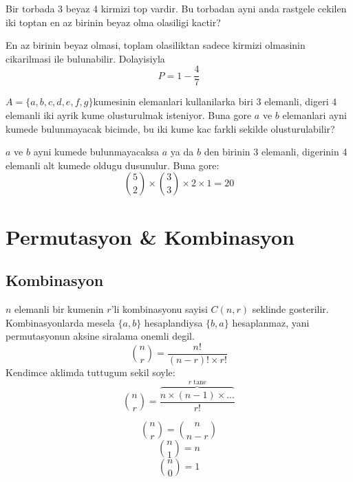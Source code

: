 \documentclass{ximera}
\begin{document}
\begin{example}
Bir torbada 3 beyaz 4 kirmizi top vardir. Bu torbadan ayni anda rastgele cekilen iki toptan en az birinin beyaz olma olasiligi kactir?
\end{example}
\begin{explanation}
En az birinin beyaz olmasi, toplam olasiliktan sadece kirmizi olmasinin cikarilmasi ile bulunabilir. Dolayisiyla
\[
P = 1 - \frac{4}{7}
\]
\end{explanation}

\begin{example}
$ A = \{a, b, c, d, e, f, g\}$kumesinin elemanlari kullanilarka biri 3 elemanli, digeri 4 elemanli iki ayrik kume olusturulmak isteniyor. Buna gore $a$ ve $b$ elemanlari ayni kumede bulunmayacak bicimde, bu iki kume kac farkli sekilde olusturulabilir?
\end{example}
\begin{explanation}
$a$ ve $b$ ayni kumede bulunmayacaksa $a$ ya da $b$ den birinin 3 elemanli, digerinin 4 elemanli alt kumede oldugu dusunulur. Buna gore:
$$
\binom{5}{2}\times \binom{3}{3}\times 2 \times 1 = 20
$$

\end{explanation}


\section{Permutasyon \& Kombinasyon}
\subsection{Kombinasyon}
$n$ elemanli bir kumenin $r$'li kombinasyonu sayisi $C(n,r)$ seklinde gosterilir. Kombinasyonlarda mesela $\{a,b\}$ hesaplandiysa $\{b,a\}$ hesaplanmaz, yani permutasyonun aksine siralama onemli degil.
\begin{equation}
    \binom{n}{r} = \frac{n!}{(n-r)! \times r!}
\end{equation}
Kendimce aklimda tuttugum sekil soyle:
\begin{equation}
    \binom{n}{r} = \frac{\overbrace{n\times(n-1)\times...}^{r\text{ tane}}}{r!}
\end{equation}
\begin{remark}
\begin{equation}
    \binom{n}{r} = \binom{n}{n-r}
\end{equation}
\begin{equation}
    \binom{n}{1} = n
\end{equation}
\begin{equation}
    \binom{n}{0} = 1
\end{equation}
\end{remark}
\end{document}
